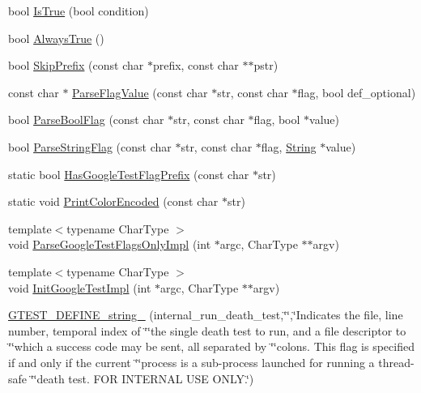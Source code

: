 \begin{DoxyCompactItemize}
\item 
bool \hyperlink{namespacetesting_1_1internal_a68c8009eb16c787f90cd989f57fb3a9a}{\-Is\-True} (bool condition)
\item 
bool \hyperlink{namespacetesting_1_1internal_a7b125f3952e08530aedb98a650ee73c1}{\-Always\-True} ()
\item 
bool \hyperlink{namespacetesting_1_1internal_ac490e9b0963689436d4c483653b3f93f}{\-Skip\-Prefix} (const char $\ast$prefix, const char $\ast$$\ast$pstr)
\item 
const char $\ast$ \hyperlink{namespacetesting_1_1internal_a5e4e5aab56cf1d77b5bf092c875142ef}{\-Parse\-Flag\-Value} (const char $\ast$str, const char $\ast$flag, bool def\-\_\-optional)
\item 
bool \hyperlink{namespacetesting_1_1internal_a777a3b389d36aa43396bab9e42286d0e}{\-Parse\-Bool\-Flag} (const char $\ast$str, const char $\ast$flag, bool $\ast$value)
\item 
bool \hyperlink{namespacetesting_1_1internal_ac43d360c9021a4fd0bd939f7c99e61a0}{\-Parse\-String\-Flag} (const char $\ast$str, const char $\ast$flag, \hyperlink{classtesting_1_1internal_1_1String}{\-String} $\ast$value)
\item 
static bool \hyperlink{namespacetesting_1_1internal_aa90ded545c69ff0535f9f6a70ab45612}{\-Has\-Google\-Test\-Flag\-Prefix} (const char $\ast$str)
\item 
static void \hyperlink{namespacetesting_1_1internal_ad448973e8494343c56ae947eb38f21a7}{\-Print\-Color\-Encoded} (const char $\ast$str)
\item 
{\footnotesize template$<$typename Char\-Type $>$ }\\void \hyperlink{namespacetesting_1_1internal_ad2d2daedebbf18eb13fb9deb1f069f6e}{\-Parse\-Google\-Test\-Flags\-Only\-Impl} (int $\ast$argc, \-Char\-Type $\ast$$\ast$argv)
\item 
{\footnotesize template$<$typename Char\-Type $>$ }\\void \hyperlink{namespacetesting_1_1internal_aa955365c835d1a8f1659369249b5b1e4}{\-Init\-Google\-Test\-Impl} (int $\ast$argc, \-Char\-Type $\ast$$\ast$argv)
\item 
\hyperlink{namespacetesting_1_1internal_a694ac3968feb2504af45c002d6d7dbf8}{\-G\-T\-E\-S\-T\-\_\-\-D\-E\-F\-I\-N\-E\-\_\-string\-\_\-} (internal\-\_\-run\-\_\-death\-\_\-test,\char`\"{}\char`\"{},\char`\"{}\-Indicates the file, line number, temporal index of \char`\"{}\char`\"{}the single death test to run, and a file descriptor to \char`\"{}\char`\"{}which a success code may be sent, all separated by \char`\"{}\char`\"{}colons.  \-This flag is specified if and only if the current \char`\"{}\char`\"{}process is a sub-\/process launched for running a thread-\/safe \char`\"{}\char`\"{}death test.  \-F\-O\-R \-I\-N\-T\-E\-R\-N\-A\-L \-U\-S\-E \-O\-N\-L\-Y.\char`\"{})
$$
\end{DoxyCompactItemize}
